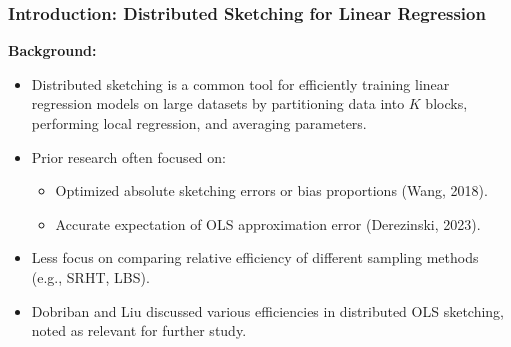 \documentclass{beamer}
\theoremstyle{remark}
\begin{document}
\begin{frame}
    \frametitle{Introduction: Distributed Sketching for Linear Regression}

    \textbf{Background:}
    \begin{itemize}
        \item Distributed sketching is a common tool for efficiently training linear regression models on large datasets by partitioning data into $K$ blocks, performing local regression, and averaging parameters.
        \item Prior research often focused on:
            \begin{itemize}
                \item Optimized absolute sketching errors or bias proportions (Wang, 2018\cite{wang2018sketchedridgeregressionoptimization}).
                \item Accurate expectation of OLS approximation error (Derezinski, 2023\cite{dereziński2023algorithmicgaussianizationsketchingconverting}).
            \end{itemize}
        \item Less focus on comparing relative efficiency of different sampling methods (e.g., SRHT, LBS).
        \item Dobriban and Liu\cite{dobriban2019asymptoticssketchingsquaresregression} discussed various efficiencies in distributed OLS sketching, noted as relevant for further study.
    \end{itemize}

    
\end{frame}
\end{document}
